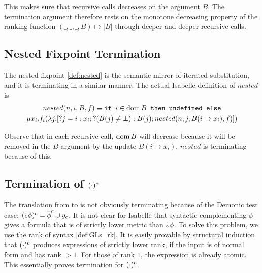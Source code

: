 This makes sure that recursive calls decreases on the argument $B$. The termination argument therefore rests on the monotone decreasing property of the ranking function $(\_,\_,\_,B)\mapsto |B|$ through deeper and deeper recursive calls. 

\subsection{Nested Fixpoint Termination}

The nested fixpoint \autoref{def:nested} is the semantic mirror of iterated substitution, and it is terminating in a similar manner. The actual Isabelle definition of $nested$ is
\begin{multline}
        nested(n,i,B,f) \equiv \texttt{if } i\in \dom B \texttt{ then undefined else}\\
        \mu x_i.f_i(\lambda j. [?j=i:x_i;?(B(j)\neq \bot): B(j); nested(n,j,B(i\mapsto x_i), f)])
\end{multline}

Observe that in each recursive call, $\dom B$ will decrease because it will be removed in the $B$ argument by the update $B(i\mapsto x_i)$. $nested$ is terminating because of this.

\subsection{Termination of $\GLsrl{c}{(\cdot)}$}
The translation from \GLs{} to \RGL{} is not obviously terminating because of the Demonic test case: $\GLsrl{c}{(\DTest\phi)}=\GLsrl{c}{\overline \phi}\cup y_c$. It is not clear for Isabelle that syntactic complementing $\phi$ gives a formula that is of strictly lower metric than $\DTest\phi$. To solve this problem, we use the rank of \GLs{} syntax \autoref{def:GLs_rk}. It is easily provable by structural induction that $\GLsrl{c}{(\cdot)}$ produces expressions of strictly lower rank, if the input is of normal form and has rank $>1$. For those of rank $1$, the expression is already atomic. This essentially proves termination for $\GLsrl{c}{(\cdot)}$.

